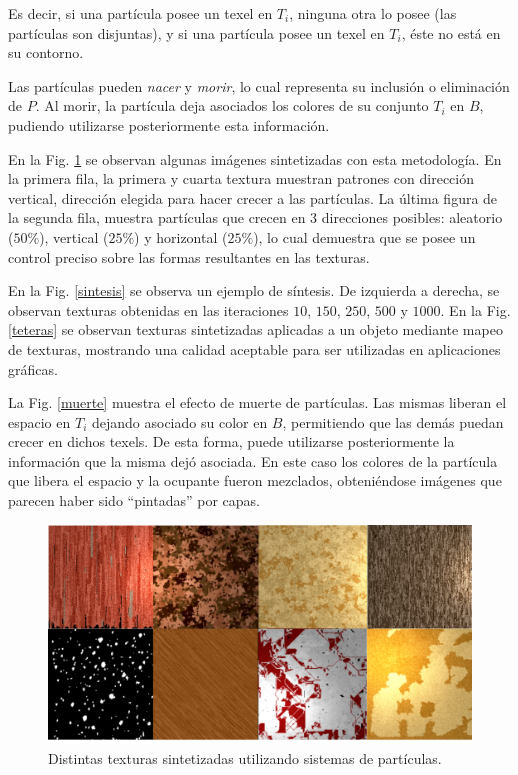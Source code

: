 Es decir, si una part\'icula posee un texel en $T_{i}$, ninguna otra lo posee (las part\'iculas son disjuntas), y si una part\'icula posee un texel en $T_{i}$, \'este no est\'a en su contorno.

Las part\'iculas pueden {\em nacer} y {\em morir}, lo cual representa su inclusi\'on o eliminaci\'on de $P$.
Al morir, la part\'icula deja asociados los colores de su conjunto $T_{i}$ en $B$, pudiendo utilizarse posteriormente esta informaci\'on.

En la Fig. \ref{resultados} se observan algunas im\'agenes sintetizadas con esta metodología.
En la primera fila, la primera y cuarta textura muestran patrones con direcci\'on vertical, direcci\'on elegida para hacer crecer a las part\'iculas.
La \'ultima figura de la segunda fila, muestra part\'iculas que crecen en 3 direcciones posibles: aleatorio ($50\%$), vertical ($25\%$) y horizontal ($25\%$), lo cual demuestra que se posee un control preciso sobre las formas resultantes en las texturas.

En la Fig. \ref{sintesis} se observa un ejemplo de s\'intesis.
De izquierda a derecha, se observan texturas obtenidas en las iteraciones $10$, $150$, $250$, $500$ y $1000$.
En la Fig. \ref{teteras} se observan texturas sintetizadas aplicadas a un objeto mediante mapeo de texturas, mostrando una calidad aceptable para ser utilizadas en aplicaciones gr\'aficas.

La Fig. \ref{muerte} muestra el efecto de muerte de part\'iculas.
Las mismas liberan el espacio en $T_{i}$ dejando asociado su color en $B$, permitiendo que las dem\'as puedan crecer en dichos texels.
De esta forma, puede utilizarse posteriormente la informaci\'on que la misma dej\'o asociada.
En este caso los colores de la part\'icula que libera el espacio y la ocupante fueron mezclados, obteni\'endose im\'agenes que parecen haber sido ``pintadas'' por capas.


\begin{figure}[t!]
\centering
\includegraphics[scale=0.18]{resultados}
\caption{Distintas texturas sintetizadas utilizando sistemas de partículas.}
\label{resultados}
\end{figure}


